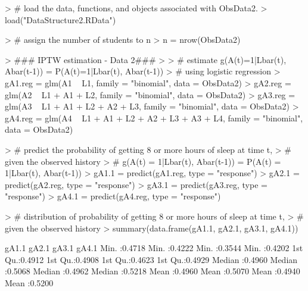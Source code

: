\documentclass[answers]{exam}
\begin{document}
\begin{enumerate}
\begin{solution}

\begin{Schunk}
\begin{Sinput}
> # load the data, functions, and objects associated with ObsData2.
> load("DataStructure2.RData")
\end{Sinput}
\end{Schunk}
\begin{Schunk}
\begin{Sinput}
> # assign the number of students to n
> n = nrow(ObsData2)
\end{Sinput}
\end{Schunk}
\begin{Schunk}
\begin{Sinput}
> ### IPTW estimation - Data 2###
> 
> # estimate g(A(t)=1|Lbar(t), Abar(t-1)) = P(A(t)=1|Lbar(t), Abar(t-1)) 
> # using logistic regression
> gA1.reg = glm(A1 ~ L1, family = "binomial", data = ObsData2)
> gA2.reg = glm(A2 ~ L1 + A1 + L2, family = "binomial", data = ObsData2)
> gA3.reg = glm(A3 ~ L1 + A1 + L2 + A2 + L3, family = "binomial", data = ObsData2)
> gA4.reg = glm(A4 ~ L1 + A1 + L2 + A2 + L3 + A3 + L4, family = "binomial", data = ObsData2)
\end{Sinput}
\end{Schunk}
\begin{Schunk}
\begin{Sinput}
> # predict the probability of getting 8 or more hours of sleep at time t, 
> # given the observed history
> # g(A(t) = 1|Lbar(t), Abar(t-1)) = P(A(t) = 1|Lbar(t), Abar(t-1))
> gA1.1 = predict(gA1.reg, type = "response")
> gA2.1 = predict(gA2.reg, type = "response")
> gA3.1 = predict(gA3.reg, type = "response")
> gA4.1 = predict(gA4.reg, type = "response")
\end{Sinput}
\end{Schunk}
\begin{Schunk}
\begin{Sinput}
> # distribution of probability of getting 8 or more hours of sleep at time t, 
> # given the observed history
> summary(data.frame(gA1.1, gA2.1, gA3.1, gA4.1))
\end{Sinput}
\begin{Soutput}
     gA1.1            gA2.1            gA3.1            gA4.1       
 Min.   :0.4718   Min.   :0.4222   Min.   :0.3544   Min.   :0.4202  
 1st Qu.:0.4912   1st Qu.:0.4908   1st Qu.:0.4623   1st Qu.:0.4929  
 Median :0.4960   Median :0.5068   Median :0.4962   Median :0.5218  
 Mean   :0.4960   Mean   :0.5070   Mean   :0.4940   Mean   :0.5200  

\end{Soutput}
\end{Schunk}
\end{solution}
\end{enumerate}
\end{document}
